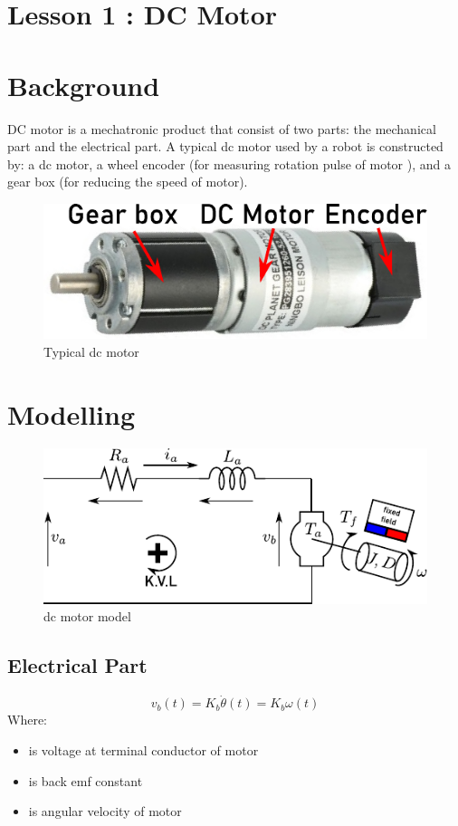 \documentclass[12pt,a4paper]{article}
\begin{document}
	\section*{\centering Lesson 1 : DC Motor}
	\section{Background}
	DC motor is a mechatronic product that consist of two parts: the mechanical part and the electrical part. A typical dc motor used by a robot is constructed by: a dc motor, a wheel encoder (for measuring rotation pulse of motor ), and a gear box (for reducing the speed of motor).
	
	\begin{figure}[ht]
		\centering
		\includegraphics[scale=1]{src/img/fig1.pdf}
		\caption{Typical dc motor}
		\label{fig:Typical dc motor}
	\end{figure}
	
	\section{Modelling}
	
	\begin{figure}[ht]
		\centering
		\includegraphics[scale=1.7]{src/img/fig2.pdf}
		\caption{dc motor model}
		\label{fig:dc motor model}
	\end{figure}
	
	\subsection{Electrical Part}
	\begin{equation}
		v_b(t) = K_b \dot{\theta}(t) = K_b \omega(t)
		\label{eq1}
	\end{equation}
	Where:
	\begin{itemize}
		\item { is voltage at terminal conductor of motor }
		\item { is back emf constant}
		\item {\makebox[1cm]{\(\dot{\theta} = \omega\)\hfill} is angular velocity of motor}
	\end{itemize}
	
\end{document}
